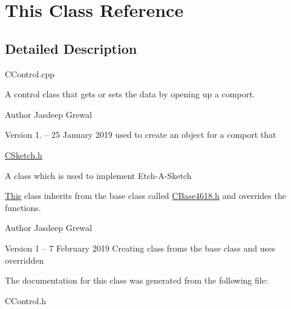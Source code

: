 \hypertarget{class_this}{}\section{This Class Reference}
\label{class_this}


\subsection{Detailed Description}
C\+Control.\+cpp

A control class that gets or sets the data by opening up a comport.

\begin{DoxyAuthor}{Author}
Jasdeep Grewal
\end{DoxyAuthor}
\begin{DoxyVersion}{Version}
1. -- 25 January 2019 used to create an object for a comport that
\end{DoxyVersion}
\hyperlink{_c_sketch_8h_source}{C\+Sketch.\+h}

A class which is used to implement Etch-\/\+A-\/\+Sketch

\hyperlink{class_this}{This} class inherits from the base class called \hyperlink{_c_base4618_8h_source}{C\+Base4618.\+h} and overrides the functions.

\begin{DoxyAuthor}{Author}
Jasdeep Grewal
\end{DoxyAuthor}
\begin{DoxyVersion}{Version}
1 -- 7 February 2019 Creating class froms the base class and uses overridden 
\end{DoxyVersion}


The documentation for this class was generated from the following file\+:\begin{DoxyCompactItemize}
\item 
C\+Control.\+h\end{DoxyCompactItemize}
